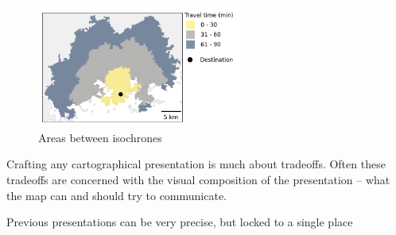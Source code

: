 \begin{figure}[H]
	\centering
	\includegraphics[width=0.6\textwidth]{visual/figures/ttm/isochrone_areas.pdf}
	\caption{Areas between isochrones}
	\label{fig:isochrone areas}
\end{figure}

Crafting any cartographical presentation is much about tradeoffs.
Often these tradeoffs are concerned with the visual composition of the presentation --
what the map can and should try to communicate.

Previous presentations can be very precise, but locked to a single place

